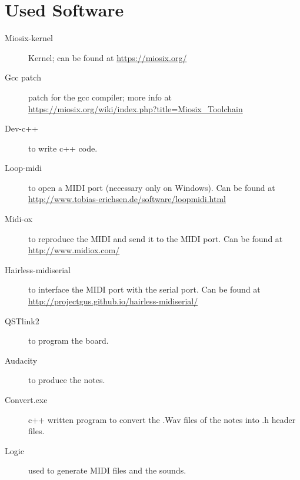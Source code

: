 \documentclass[12pt]{article}
\begin{document}
\section{Used Software} \label{sec:used}
\begin{description} 
	\item[Miosix-kernel] Kernel; can be found at \url{https://miosix.org/}
	\item[Gcc patch] patch for the gcc compiler; more info at \url{https://miosix.org/wiki/index.php?title=Miosix_Toolchain}
	\item[Dev-c++] to write c++  code.
	\item[Loop-midi] to open a MIDI port (necessary only on Windows). Can be found at \url{http://www.tobias-erichsen.de/software/loopmidi.html}
	\item[Midi-ox] to reproduce the MIDI and send it to the MIDI port. Can be found at \url{http://www.midiox.com/}
	\item[Hairless-midiserial] to interface the MIDI port with the serial port. Can be found at \url{http://projectgus.github.io/hairless-midiserial/}
	\item[QSTlink2] to program the board.
	\item[Audacity] to produce the notes.
	\item[Convert.exe] c++ written program to convert the .Wav files  of the notes into .h header files.
	\item[Logic] used to generate MIDI files and the sounds.
\end{description}
\end{document}
